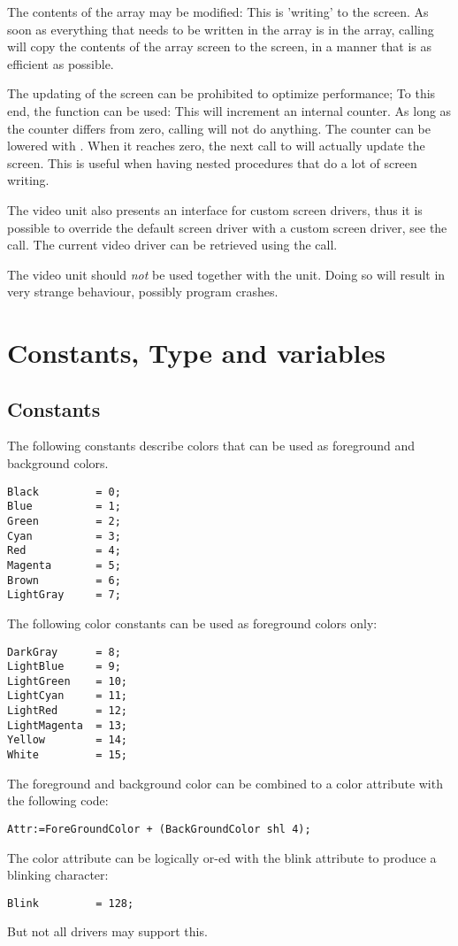The contents of the  array may be modified: This is 'writing'
to the screen. As soon as everything that needs to be written in the array
is in the  array, calling  will copy the
contents of the array screen to the screen, in a manner that is as efficient
as possible.

The updating of the screen can be prohibited to optimize performance; To
this end, the  function can be used: This will
increment an internal counter. As long as the counter differs from zero,
calling  will not do anything. The counter can be
lowered with . When it reaches zero, the next call
to  will actually update the screen. This is useful when
having nested procedures that do a lot of screen writing.

The video unit also presents an interface for custom screen drivers, thus
it is possible to override the default screen driver with a custom screen 
driver, see the  call. The current video driver can
be retrieved using the  call.

\begin{remark}
The video unit should {\em not} be used together with the  unit.
Doing so will result in very strange behaviour, possibly program crashes.
\end{remark}

\section{Constants, Type and variables }

\subsection{Constants}
\label{vidcolorconst}
The following constants describe colors that can be used as 
foreground and background colors.
\begin{verbatim}
Black         = 0;
Blue          = 1;
Green         = 2;
Cyan          = 3;
Red           = 4;
Magenta       = 5;
Brown         = 6;
LightGray     = 7;
\end{verbatim}
The following color constants can be used as foreground colors only:
\begin{verbatim}
DarkGray      = 8;
LightBlue     = 9;
LightGreen    = 10;
LightCyan     = 11;
LightRed      = 12;
LightMagenta  = 13;
Yellow        = 14;
White         = 15;
\end{verbatim}
The foreground and background color can be combined to a color attribute
with the following code:
\begin{verbatim}
Attr:=ForeGroundColor + (BackGroundColor shl 4);
\end{verbatim}
The color attribute can be logically or-ed with the blink attribute to
produce a blinking character:
\begin{verbatim}
Blink         = 128;
\end{verbatim}
But not all drivers may support this.

